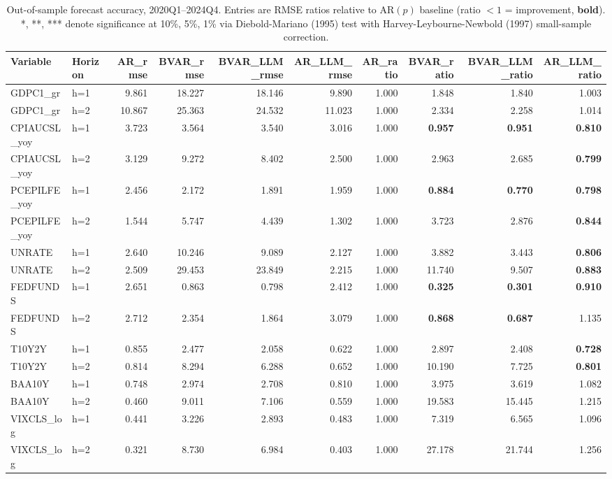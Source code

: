 \begin{table}[htbp]
\centering
\small
\caption{Out-of-sample forecast accuracy, 2020Q1--2024Q4. Entries are RMSE ratios relative to AR$(p)$ baseline (ratio $<1$ = improvement, \textbf{bold}). *, **, *** denote significance at 10\%, 5\%, 1\% via Diebold-Mariano (1995) test with Harvey-Leybourne-Newbold (1997) small-sample correction.}
\label{tab:main_results}
\begin{tabular}{llrrrrrrrr}
\toprule
Variable & Horizon & AR_rmse & BVAR_rmse & BVAR_LLM_rmse & AR_LLM_rmse & AR_ratio & BVAR_ratio & BVAR_LLM_ratio & AR_LLM_ratio \\
\midrule
GDPC1_gr & h=1 & 9.861 & 18.227 & 18.146 & 9.890 & 1.000 & 1.848 & 1.840 & 1.003 \\
GDPC1_gr & h=2 & 10.867 & 25.363 & 24.532 & 11.023 & 1.000 & 2.334 & 2.258 & 1.014 \\
CPIAUCSL_yoy & h=1 & 3.723 & 3.564 & 3.540 & 3.016 & 1.000 & \textbf{0.957} & \textbf{0.951} & \textbf{0.810} \\
CPIAUCSL_yoy & h=2 & 3.129 & 9.272 & 8.402 & 2.500 & 1.000 & 2.963 & 2.685 & \textbf{0.799} \\
PCEPILFE_yoy & h=1 & 2.456 & 2.172 & 1.891 & 1.959 & 1.000 & \textbf{0.884} & \textbf{0.770} & \textbf{0.798} \\
PCEPILFE_yoy & h=2 & 1.544 & 5.747 & 4.439 & 1.302 & 1.000 & 3.723 & 2.876 & \textbf{0.844} \\
UNRATE & h=1 & 2.640 & 10.246 & 9.089 & 2.127 & 1.000 & 3.882 & 3.443 & \textbf{0.806} \\
UNRATE & h=2 & 2.509 & 29.453 & 23.849 & 2.215 & 1.000 & 11.740 & 9.507 & \textbf{0.883} \\
FEDFUNDS & h=1 & 2.651 & 0.863 & 0.798 & 2.412 & 1.000 & \textbf{0.325} & \textbf{0.301} & \textbf{0.910} \\
FEDFUNDS & h=2 & 2.712 & 2.354 & 1.864 & 3.079 & 1.000 & \textbf{0.868} & \textbf{0.687} & 1.135 \\
T10Y2Y & h=1 & 0.855 & 2.477 & 2.058 & 0.622 & 1.000 & 2.897 & 2.408 & \textbf{0.728} \\
T10Y2Y & h=2 & 0.814 & 8.294 & 6.288 & 0.652 & 1.000 & 10.190 & 7.725 & \textbf{0.801} \\
BAA10Y & h=1 & 0.748 & 2.974 & 2.708 & 0.810 & 1.000 & 3.975 & 3.619 & 1.082 \\
BAA10Y & h=2 & 0.460 & 9.011 & 7.106 & 0.559 & 1.000 & 19.583 & 15.445 & 1.215 \\
VIXCLS_log & h=1 & 0.441 & 3.226 & 2.893 & 0.483 & 1.000 & 7.319 & 6.565 & 1.096 \\
VIXCLS_log & h=2 & 0.321 & 8.730 & 6.984 & 0.403 & 1.000 & 27.178 & 21.744 & 1.256 \\
\bottomrule
\end{tabular}
\end{table}